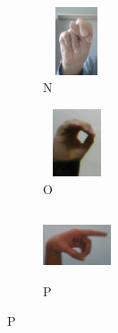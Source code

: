 \begin{figure}[H]
  

  \begin{subfigure}{0.1\textwidth}
    \includegraphics[width=2cm, height=2cm, keepaspectratio=false]{images/7-anexe/n_ex1.jpg}
    \caption{N}
  \end{subfigure}\hspace{1cm}
  \begin{subfigure}{0.1\textwidth}
    \includegraphics[width=2cm, height=2cm, keepaspectratio=false]{images/7-anexe/o_ex1.jpg}
    \caption{O}
  \end{subfigure}\hspace{1cm}
  \begin{subfigure}{0.1\textwidth}
    \includegraphics[width=2cm, height=2cm, keepaspectratio=false]{images/7-anexe/p_ex1.jpg}
    \caption{P}
  \end{subfigure}\hspace{1cm}

  


\end{figure}
